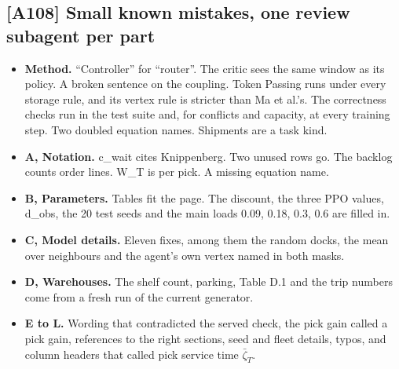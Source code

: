 \documentclass[11pt,a4paper]{article}
\begin{document}
\subsection*{[A108] Small known mistakes, one review subagent per part}
\begin{itemize}
  \item \textbf{Method.} ``Controller'' for ``router''. The critic sees the same
        window as its policy. A broken sentence on the coupling. Token Passing
        runs under every storage rule, and its vertex rule is stricter than
        Ma et al.'s. The correctness checks run in the test suite and, for
        conflicts and capacity, at every training step. Two doubled equation
        names. Shipments are a task kind.
  \item \textbf{A, Notation.} c\_wait cites Knippenberg. Two unused rows go. The
        backlog counts order lines. W\_T is per pick. A missing equation name.
  \item \textbf{B, Parameters.} Tables fit the page. The discount, the three PPO
        values, d\_obs, the 20 test seeds and the main loads 0.09, 0.18, 0.3,
        0.6 are filled in.
  \item \textbf{C, Model details.} Eleven fixes, among them the random docks, the
        mean over neighbours and the agent's own vertex named in both masks.
  \item \textbf{D, Warehouses.} The shelf count, parking, Table D.1 and the trip
        numbers come from a fresh run of the current generator.
  \item \textbf{E to L.} Wording that contradicted the served check, the pick gain
        called a pick gain, references to the right sections, seed and fleet
        details, typos, and column headers that called pick service time
        $\bar\zeta_T$.
\end{itemize}
\end{document}
